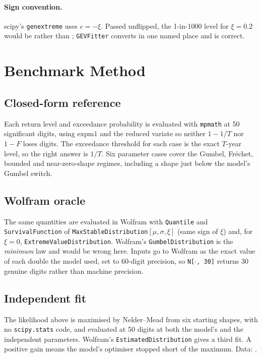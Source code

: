 \documentclass[11pt,a4paper]{article}
\begin{document}
\paragraph{Sign convention.} scipy's \texttt{genextreme} uses $c=-\xi$. Passed
unflipped, the 1-in-1000 level for $\xi=0.2$ would be \bmTrapWrong{} rather than
\bmTrapRight; \texttt{GEVFitter} converts in one named place and is correct.

\section{Benchmark Method}

\subsection{Closed-form reference}
Each return level and exceedance probability is evaluated with \texttt{mpmath}
at 50 significant digits, using $\mathrm{expm1}$ and the reduced variate so
neither $1-1/T$ nor $1-F$ loses digits. The exceedance threshold for each case
is the exact $T$-year level, so the right answer is $1/T$. Six parameter cases
cover the Gumbel, Fr\'echet, bounded and near-zero-shape regimes, including a
shape just below the model's Gumbel switch.

\subsection{Wolfram oracle}
\begin{sloppypar}
The same quantities are evaluated in Wolfram with \texttt{Quantile} and
\texttt{SurvivalFunction} of \texttt{MaxStableDistribution}$[\mu,\sigma,\xi]$
(same sign of $\xi$) and, for $\xi=0$, \texttt{ExtremeValueDistribution}.
Wolfram's \texttt{GumbelDistribution} is the \emph{minimum} law and would be
wrong here.
Inputs go to Wolfram as the exact value of each double the model used, set to
60-digit precision, so \texttt{N[$\cdot$, 30]} returns 30 genuine digits rather
than machine precision.
\end{sloppypar}

\subsection{Independent fit}
The likelihood above is maximised by Nelder--Mead from six starting shapes, with
no \texttt{scipy.stats} code, and evaluated at 50 digits at both the model's and
the independent parameters. Wolfram's \texttt{EstimatedDistribution} gives a
third fit. A positive gain means the model's optimiser stopped short of the
maximum. Data: \bmData.
\end{document}
